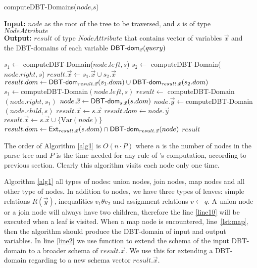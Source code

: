 \documentclass[12pt]{article}
\begin{document}
\begin{algorithm}[H]
\caption{computeDBT-Domains($node$,$s$)} 
\label{alg1}
\textbf{Input:} $node$ as the root of the tree to be traversed, and $s$ is of type $NodeAttribute$ \\
\textbf{Output:}  $result$ of type $NodeAttribute$ that contains vector of variables $\vec x$ and the DBT-domains of each variable $\textsf{DBT-dom}{}_{\vec x}(query)$
\begin{algorithmic}[1]
\STATE  $s_{1}\gets$ computeDBT-Domain($node.left, s$)
\STATE  $s_{2}\gets$ computeDBT-Domain($node.right, s$)
\STATE  $result.\vec{x}\gets s_{1}.\vec{x} \cup s_{2}.\vec{x}$ %
\STATE  $result.dom\gets \text{\textsf{DBT-dom}}_{result.\vec x}(s_{1}.dom)\cup\text{\textsf{DBT-dom}}_{result.\vec x}(s_{2}.dom)$
\label{line:join1}
\STATE  $s_{1} \gets \text{computeDBT-Domain}(node.left, s)$\label{line:join2}
\STATE $result\gets$ computeDBT-Domain$(node.right, s_{1})$
\label{lst:map}
\STATE $node.\vec{x}\gets\text{\textsf{DBT-dom}}_{s.\vec{x}}(s.dom)$
\STATE $node.\vec{y}\gets$computeDBT-Domain$(node.child,s)$\label{lst:child}
\STATE $result.\vec{x}\gets s.\vec{x}$
\STATE $result.dom\gets node.\vec{y}$
\ELSE 
\label{line10}
\STATE $result.\vec{x}\gets s.\vec{x} \cup \{\text{Var$(node)$}\}$\label{lst:setofallvar}
\STATE $result.dom\gets \text{\textsf{Ext}}_{result.\vec{x}}(s.dom)\cap\text{\textsf{DBT-dom}}_{result.\vec{x}}(node)$\label{line2}
\ENDIF
\RETURN $result$
\end{algorithmic}
\end{algorithm}
The order of Algorithm \ref{alg1} is $O(n\cdot P)$ where $n$ is the number of nodes in the parse tree and $P$ is the time needed for any rule of \dom{}'s computation, according to previous section. Clearly this algorithm visits each node only one time. \par

Algorithm \ref{alg1} all types of nodes: union nodes, join nodes, map nodes and all other type of nodes. In addition to nodes, we have three types of leaves: simple relations $R(\vec y)$, inequalities $v_{1}\theta v_{2}$ and assignment relations $v \gets q$. A union node or a join node will always have two children, therefore the line \ref{line10} will be executed when a leaf is visited. When a map node is encountered, line~\ref{lst:map}, then the algorithm should produce the DBT-domain of input and output variables. In line \ref{line2} we use function \Ext{} to extend the schema of the input DBT-domain to a broader schema of $result.\vec{x}$. We use this for extending a DBT-domain regarding to a new schema vector $result.\vec x$. 
\end{document}
